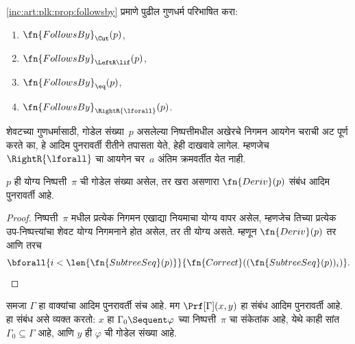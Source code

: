\begin{prob}
  \ref{inc:art:plk:prop:followsby} प्रमाणे पुढील गुणधर्म
  परिभाषित करा:
  \begin{enumerate}
  \item $\fn{FollowsBy}_{\Cut}(p)$,
  \item $\fn{FollowsBy}_{\LeftR\lif}(p)$,
  \item $\fn{FollowsBy}_{\eq}(p)$,
  \item $\fn{FollowsBy}_{\RightR{\lforall}}(p)$.
  \end{enumerate}
  शेवटच्या गुणधर्मासाठी, गोडेल संख्या~$p$ असलेल्या
  निष्पत्तीमधील अखेरचे निगमन आयगेन चराची अट पूर्ण करते
  का, हे आदिम पुनरावर्ती रीतीने तपासता येते, हेही दाखवावे लागेल.
  म्हणजेच $\RightR{\lforall}$ चा आयगेन चर~$a$ अंतिम
  क्रमवर्तीत येत नाही.
\end{prob}

\begin{prop}
  \label{inc:art:plk:prop:deriv}
  $p$ ही योग्य निष्पत्ती~$\pi$ ची गोडेल संख्या असेल, तर खरा
  असणारा $\fn{Deriv}(p)$ संबंध आदिम पुनरावर्ती आहे.
\end{prop}

\begin{proof}
  निष्पत्ती~$\pi$ मधील प्रत्येक निगमन एखाद्या नियमाचा योग्य
  वापर असेल, म्हणजेच तिच्या प्रत्येक उप-निष्पत्त्यांचा शेवट
  योग्य निगमनाने होत असेल, तर ती योग्य असते. म्हणून
  $\fn{Deriv}(p)$ तर आणि तरच
  \[  \bforall{i<\len{\fn{SubtreeSeq}(p)}}{\fn{Correct}((\fn{SubtreeSeq}(p))_i)}.
  \]
\end{proof}

\begin{prop}
समजा $\Gamma$ हा वाक्यांचा आदिम पुनरावर्ती संच आहे.
मग $\Prf[\Gamma](x, y)$ हा संबंध आदिम पुनरावर्ती आहे. हा संबंध
असे व्यक्त करतो: $x$ हा $\Gamma_0 \Sequent \varphi$ च्या
निष्पत्ती~$\pi$ चा संकेतांक आहे, येथे काही सांत
$\Gamma_0 \subseteq \Gamma$ आहे, आणि $y$ ही $\varphi$ ची गोडेल संख्या आहे.
\end{prop}


